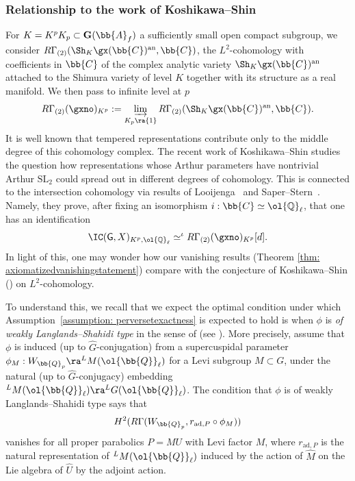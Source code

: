 \documentclass[letterpaper,11pt]{amsart}
\begin{document}
\subsubsection{Relationship to the work of Koshikawa--Shin}{\label{ss: comparisonwithKoshikawaShin}}
For $K = K^{p}K_{p} \subset \mathbf{G}(\bb{A}_{f})$ a sufficiently small open compact subgroup, we consider $R\Gamma_{(2)}(\Sh_{K}\gx(\bb{C})^{\mathrm{an}},\bb{C})$, the $L^{2}$-cohomology with coefficients in $\bb{C}$ of the complex analytic variety $\Sh_{K}\gx(\bb{C})^{\mathrm{an}}$ attached to the Shimura variety of level $K$ together with its structure as a real manifold. We then pass to infinite level at $p$
\begin{equation}{\label{eqn: L2Cohomology}} 
R\Gamma_{(2)}(\gxno)_{K^{p}} := \varinjlim_{K_{p} \ra \{1\}} R\Gamma_{(2)}(\Sh_{K}\gx(\bb{C})^{\mathrm{an}},\bb{C}). 
\end{equation}
It is well known that tempered representations contribute only to the middle degree of this cohomology complex. The recent work of Koshikawa--Shin \cite{KoshikawaShin} studies the question how representations whose Arthur parameters have nontrivial Arthur $\mathrm{SL}_2$ could spread out in different degrees of cohomology. This is connected to the intersection cohomology via results of Looijenga~\cite{Looijenga88} and Saper--Stern~\cite{SaperStern}. Namely, they prove, after fixing an isomorphism $i: \bb{C} \simeq \ol{\mathbb{Q}}_{\ell}$, that one has an identification
\begin{equation}{\label{eqn: IntCohtoL2Coh}}
 \IC(\mathsf{G},X)_{K^{p},\ol{\mathbb{Q}}_{\ell}} \simeq^{\iota}  R\Gamma_{(2)}(\gxno)_{K^{p}}[d]. 
\end{equation}
In light of this, one may wonder how our vanishing results (Theorem \ref{thm: axiomatizedvanishingstatement}) compare with the conjecture of Koshikawa--Shin (\cite[Conjecture~1.2.1]{KoshikawaShin}) on $L^{2}$-cohomology. 

To understand this, we recall that we expect the optimal condition under which Assumption~\ref{assumption: perversetexactness} is expected to hold is when $\phi$ is \emph{of weakly Langlands--Shahidi type} in the sense of \cite{HamannLeeTorsion} (see \cite[Conjecture~6.4]{HamannLeeTorsion}). More precisely, assume that $\phi$ is induced (up to $\widehat{G}$-conjugation) from a supercuspidal parameter $\phi_{M}: W_{\bb{Q}_{p}} \ra \phantom{}^{L}M(\ol{\bb{Q}}_{\ell})$ for a Levi subgroup $M \subset G$, under the natural (up to $\widehat{G}$-conjugacy) embedding $\phantom{}^{L}M(\ol{\bb{Q}}_{\ell}) \ra \phantom{}^{L}G(\ol{\bb{Q}}_{\ell})$. The condition that $\phi$ is of weakly Langlands--Shahidi type says that 
\[ H^{2}(R\Gamma(W_{\bb{Q}_{p}},r_{\mathrm{ad},P} \circ \phi_{M})) \]
vanishes for all proper parabolics $P = MU$ with Levi factor $M$, where $r_{\mathrm{ad},P}$ is the natural representation of $\phantom{}^{L}M(\ol{\bb{Q}}_{\ell})$ induced by the action of $\widehat{M}$ on the Lie algebra of $\widehat{U}$ by the adjoint action.
\end{document}
